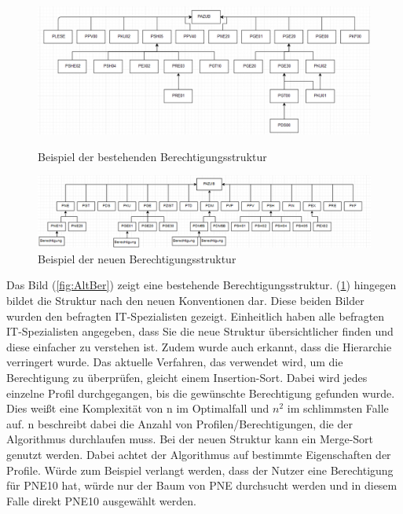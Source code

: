 \begin{figure}[h!]
\hspace*{-2cm}
 \centering
 \includegraphics[width=1.25\textwidth]{gfx/Picture/Vorher.PNG}
 \caption{Beispiel der bestehenden Berechtigungsstruktur}
 \label{fig:AltBer}
\hspace*{-2cm}
 \centering
 \includegraphics[width=1.25\textwidth]{gfx/Picture/Nachher.PNG}
 \caption{Beispiel der neuen Berechtigungsstruktur}
 \label{fig:NeuBer}
\end{figure}
Das Bild (\ref{fig:AltBer}) zeigt eine bestehende Berechtigungsstruktur.
(\ref{fig:NeuBer}) hingegen bildet die Struktur nach den neuen Konventionen dar.
Diese beiden Bilder wurden den befragten IT-Spezialisten gezeigt.
Einheitlich haben alle befragten IT-Spezialisten angegeben, dass Sie die neue Struktur übersichtlicher finden und diese einfacher zu verstehen ist.
Zudem wurde auch erkannt, dass die Hierarchie verringert wurde.
\newline
Das aktuelle Verfahren, das verwendet wird, um die Berechtigung zu überprüfen, gleicht einem Insertion-Sort.
Dabei wird jedes einzelne Profil durchgegangen, bis die gewünschte Berechtigung gefunden wurde.
Dies weißt eine Komplexität von n im Optimalfall und $n^2$ im schlimmsten Falle auf.
n beschreibt dabei die Anzahl von Profilen/Berechtigungen, die der Algorithmus durchlaufen muss. \cite[12]{log} \cite{weblogMer}
\newline
Bei der neuen Struktur kann ein Merge-Sort genutzt werden.
Dabei achtet der Algorithmus auf bestimmte Eigenschaften der Profile.
Würde zum Beispiel verlangt werden, dass der Nutzer eine Berechtigung für PNE10 hat, würde nur der Baum von PNE durchsucht werden und in diesem Falle direkt PNE10 ausgewählt werden.
